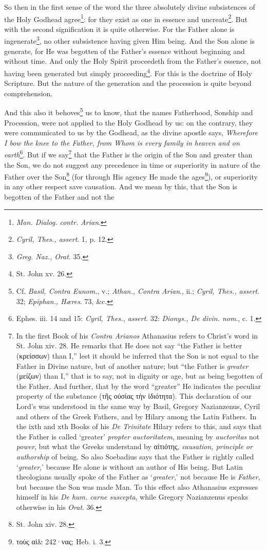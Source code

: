 So then in the first sense of the word the three absolutely divine subsistences of the Holy Godhead agree\footnote{\emph{Man. Dialog. contr. Arian}.}: for they exist as one in essence and uncreate\footnote{\emph{Cyril, Thes., assert}. 1, p. 12.}. But with the second signification it is quite otherwise. For the Father alone is ingenerate\footnote{\emph{Greg. Naz., Orat}. 35.}, no other subsistence having given Him being. And the Son alone is generate, for He was begotten of the Father’s essence without beginning and without time. And only the Holy Spirit proceedeth from the Father’s essence, not having been generated but simply proceeding\footnote{St. John xv. 26.}. For this is the doctrine of Holy Scripture. But the nature of the generation and the procession is quite beyond comprehension.

And this also it behoves\footnote{Cf. \emph{Basil, Contra Eunom.}, v.; \emph{Athan., Contra Arian}., ii.; \emph{Cyril, Thes., assert}. 32; \emph{Epiphan., Hæres}. 73, \&c.} us to know, that the names Fatherhood, Sonship and Procession, were not applied to the Holy Godhead by us: on the contrary, they were communicated to us by the Godhead, as the divine apostle says, \emph{Wherefore I bow the knee to the Father, from Whom is every family in heaven and on earth}\footnote{Ephes. iii. 14 and 15: \emph{Cyril, Thes., assert}. 32: \emph{Dionys., De divin. nom}., c. 1.}. But if we say\footnote{In the first Book of his \emph{Contra Arianos }Athanasius refers to Christ’s word in St. John xiv. 28. He remarks that He does not say “the Father is better (\textgreek{κρείσσων}) than I,” lest it should be inferred that the Son is not equal to the Father in Divine nature, but of another nature; but “the Father is \emph{greater }(\textgreek{μείζων}) than I,” that is to say, not in dignity or age, but as being begotten of the Father. And further, that by the word “greater” He indicates the peculiar property of the substance (\textgreek{τῆς οὐσίας τὴν ἰδιότητα}). This declaration of our Lord’s was understood in the same way by Basil, Gregory Nazianzenus, Cyril and others of the Greek Fathers, and by Hilary among the Latin Fathers. In the ixth and xth Books of his \emph{De Trinitate }Hilary refers to this, and says that the Father is called ‘greater’ \emph{propter auctoritatem}, meaning by \emph{auctoritas }not \emph{power}, but what the Greeks understand by \textgreek{αἰτιότης}, \emph{causation, principle or authorship }of being. So also Soebadius says that the Father is rightly called ‘\emph{greater},’ because He alone is without an author of His being. But Latin theologians usually spoke of the Father as ‘\emph{greater},’ not because He is \emph{Father}, but because the Son was made Man. To this effect also Athanasius expresses himself in his \emph{De hum. carne suscepta}, while Gregory Nazianzenus speaks otherwise in his \emph{Orat}. 36.} that the Father is the origin of the Son and greater than the Son, we do not suggest any precedence in time or superiority in nature of the Father over the Son\footnote{St. John xiv. 28.} (for through His agency He made the ages\footnote{\textgreek{τοὺς αἰ\& 242·νας}; Heb. i. 3.}), or superiority in any other respect save causation. And we mean by this, that the Son is begotten of the Father and not the 